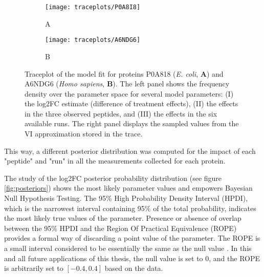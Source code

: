 \begin{figure}[!h]
\begin{subfigure}{\textwidth}
\centering
\caption*{A}
\texttt{[image: traceplots/P0A8I8]}
\end{subfigure}
\bigskip
\begin{subfigure}{\textwidth}
\centering
\caption*{B}
\texttt{[image: traceplots/A6NDG6]}
\end{subfigure}
\caption[Traceplots for 2 proteins]{Traceplot of the model fit for proteins P0A818 (\textit{E. coli}, \textbf{A}) and A6NDG6 (\textit{Homo sapiens}, \textbf{B}). The left panel shows the frequency density over the parameter space for several model parameters: (I) the \ac{log2FC} estimate (difference of treatment effects), (II) the effects in the three observed peptides, and (III) the effects in the six available runs. The right panel displays the sampled values from the \ac{VI} approximation stored in the trace.}
\label{fig:traceplots}
\end{figure}

This way, a different posterior distribution was computed for the impact of each "peptide" and "run" in all the measurements collected for each protein.


The study of the \ac{log2FC} posterior probability distribution (see figure \ref{fig:posteriors}) shows the most likely parameter values and empowers Bayesian Null Hypothesis Testing. The 95\% High Probability Density Interval (\ac{HPDI}), which is the narrowest interval containing 95\% of the total probability, indicates the most likely true values of the parameter. Presence or absence of overlap between the 95\% \ac{HPDI} and the Region Of Practical Equivalence (\ac{ROPE}) provides a formal way of discarding a point value of the parameter. The \ac{ROPE} is a small interval considered to be essentially the same as the null value \cite{Kruschke}. In this and all future applications of this thesis, the null value is set to 0, and the \ac{ROPE} is arbitrarily set to $[-0.4, 0.4]$ based on the data.

